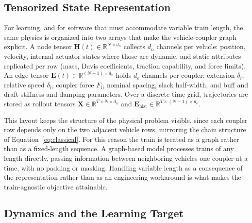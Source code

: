 \documentclass[numbered]{trbunofficial}
\begin{document}
\subsection{Tensorized State Representation}

For learning, and for software that must accommodate variable train length, the same physics is organized into two arrays that make the vehicle-coupler graph explicit. A node tensor $\mathbf{H}(t) \in \mathbb{R}^{N \times d_n}$ collects $d_n$ channels per vehicle: position, velocity, internal actuator states where those are dynamic, and static attributes replicated per row (mass, Davis coefficients, traction capability, and force limits). An edge tensor $\mathbf{E}(t) \in \mathbb{R}^{(N-1) \times d_e}$ holds $d_e$ channels per coupler: extension $\delta_i$, relative speed $\dot{\delta}_i$, coupler force $F_i$, nominal spacing, slack half-width, and buff and draft stiffness and damping parameters. Over a discrete time grid, trajectories are stored as rollout tensors $\mathbf{X} \in \mathbb{R}^{T \times N \times d_n}$ and $\mathbf{E}_{\mathrm{hist}} \in \mathbb{R}^{T \times (N-1) \times d_e}$.

This layout keeps the structure of the physical problem visible, since each coupler row depends only on the two adjacent vehicle rows, mirroring the chain structure of Equation~\ref{eq:classical}. For this reason the train is treated as a graph rather than as a fixed-length sequence. A graph-based model processes trains of any length directly, passing information between neighboring vehicles one coupler at a time, with no padding or masking. Handling variable length as a consequence of the representation rather than as an engineering workaround is what makes the train-agnostic objective attainable.

\subsection{Dynamics and the Learning Target}
\end{document}
